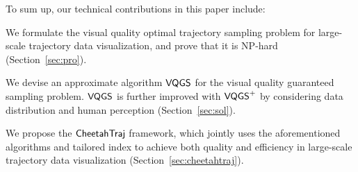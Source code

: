 
To sum up, our technical contributions in this paper include:
\squishlist
  \item We formulate the visual quality optimal trajectory sampling problem for large-scale trajectory data visualization, and prove that it is {NP-hard} (Section~\ref{sec:pro}).
  \item We devise an approximate algorithm $\mathsf{VQGS}$ for the visual quality guaranteed sampling problem. $\mathsf{VQGS}$ is further improved with $\mathsf{VQGS}^+$ by considering data distribution and human perception (Section~\ref{sec:sol}).
  \item We propose the $\mathsf{CheetahTraj}$ framework, which jointly uses the aforementioned algorithms and tailored index to achieve both quality and efficiency in large-scale trajectory data visualization (Section~\ref{sec:cheetahtraj}).


